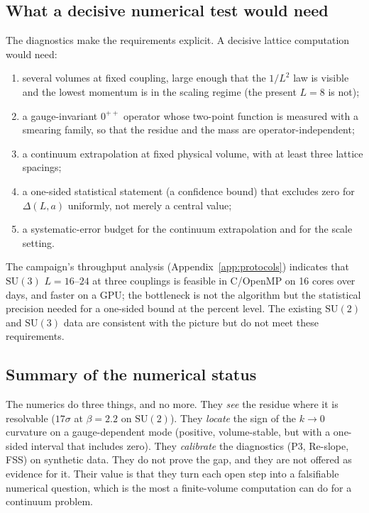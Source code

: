 \subsection{What a decisive numerical test would need}

The diagnostics make the requirements explicit. A decisive lattice computation would need:
\begin{enumerate}
\item several volumes at fixed coupling, large enough that the $1/L^2$ law is visible and the
  lowest momentum is in the scaling regime (the present $L=8$ is not);
\item a gauge-invariant $0^{++}$ operator whose two-point function is measured with a smearing
  family, so that the residue and the mass are operator-independent;
\item a continuum extrapolation at fixed physical volume, with at least three lattice spacings;
\item a one-sided statistical statement (a confidence bound) that excludes zero for
  $\Delta(L,a)$ uniformly, not merely a central value;
\item a systematic-error budget for the continuum extrapolation and for the scale setting.
\end{enumerate}
The campaign's throughput analysis (Appendix~\ref{app:protocols}) indicates that $\mathrm{SU}(3)$
$L=16$--$24$ at three couplings is feasible in C/OpenMP on 16 cores over days, and faster on a
GPU; the bottleneck is not the algorithm but the statistical precision needed for a one-sided
bound at the percent level. The existing $\mathrm{SU}(2)$ and $\mathrm{SU}(3)$ data are
consistent with the picture but do not meet these requirements.

\subsection{Summary of the numerical status}

The numerics do three things, and no more. They \emph{see} the residue where it is resolvable
($17\sigma$ at $\beta=2.2$ on $\mathrm{SU}(2)$). They \emph{locate} the sign of the $k\to0$
curvature on a gauge-dependent mode (positive, volume-stable, but with a one-sided interval that
includes zero). They \emph{calibrate} the diagnostics (P3, Re-slope, FSS) on synthetic data. They
do not prove the gap, and they are not offered as evidence for it. Their value is that they turn
each open step into a falsifiable numerical question, which is the most a finite-volume
computation can do for a continuum problem.

